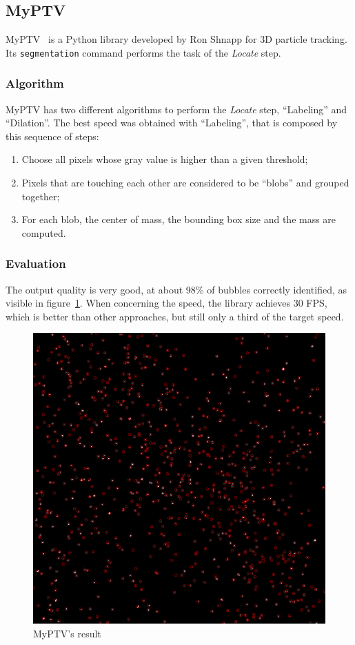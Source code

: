 \subsection{MyPTV}
\label{sec:locate:myptv}

MyPTV~\cite{myptv} is a Python library developed by Ron Shnapp for 3D particle tracking.
Its \texttt{segmentation} command performs the task of the \textit{Locate} step.

\subsubsection{Algorithm}

MyPTV has two different algorithms to perform the \textit{Locate} step, ``Labeling'' and ``Dilation''.
The best speed was obtained with ``Labeling'', that is composed by this sequence of steps:
\begin{enumerate}
	\itemsep 0em
	\item Choose all pixels whose gray value is higher than a given threshold;
	\item Pixels that are touching each other are considered to be ``blobs'' and grouped together;
	\item For each blob, the center of mass, the bounding box size and the mass are computed.
\end{enumerate}

\subsubsection{Evaluation}

The output quality is very good, at about 98\% of bubbles correctly identified, as visible in figure~\ref{fig:locate:myptv}.
When concerning the speed, the library achieves 30 FPS, which is better than other approaches, but still only a third of the target speed.

\begin{figure}
	\centerline{\includegraphics[width=\locateimgsize]{images/locate/myptv.png}}
	\caption{\centering MyPTV's result}
	\label{fig:locate:myptv}
\end{figure}
